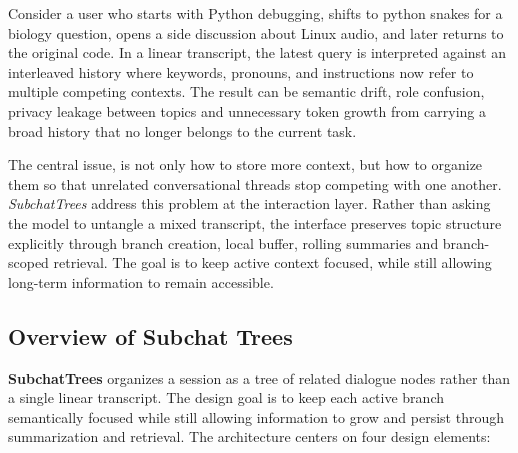 \documentclass[pdflatex,sn-mathphys-num]{sn-jnl}%
\theoremstyle{thmstyleone}%
\theoremstyle{thmstyletwo}%
\theoremstyle{thmstylethree}%
\begin{document}
Consider a user who starts with Python debugging, shifts to python snakes for a biology question, opens a side discussion about Linux audio, and later returns to the original code. In a linear transcript, the latest query is interpreted against an interleaved history where keywords, pronouns, and instructions now refer to multiple competing contexts. The result can be semantic drift, role confusion, privacy leakage between topics and unnecessary token growth from carrying a broad history that no longer belongs to the current task.







The central issue, is not only how to store more context, but how to organize them so that unrelated conversational threads stop competing with one another. \textit{SubchatTrees} address this problem at the interaction layer. Rather than asking the model to untangle a mixed transcript, the interface preserves topic structure explicitly through branch creation, local buffer, rolling summaries and branch-scoped retrieval. The goal is to keep active context focused, while still allowing long-term information to remain accessible.









\subsection{Overview of Subchat Trees}\label{subsec:approach}

\textbf{SubchatTrees} organizes a session as a tree of related dialogue nodes rather than a single linear transcript. The design goal is to keep each active branch semantically focused while still allowing information to grow and persist through summarization and retrieval. The architecture centers on four design elements:
\end{document}
